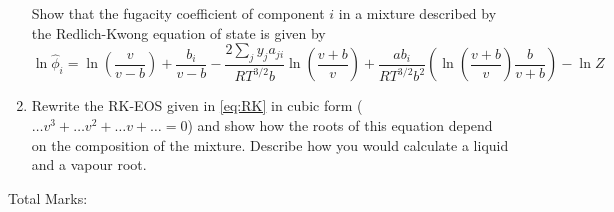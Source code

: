\documentclass[12pt, A4paper]{article}
\begin{document}
\begin{enumerate}
 Show that the fugacity coefficient of component $i$ in a mixture described by the Redlich-Kwong equation of state is given by
\begin{equation} \label{eq:phi_RK}
\ln{\hat{\phi}_i} = \ln{\left(\frac{v}{v - b} \right)}  + \frac{b_i}{v - b} - \frac{2 \sum_{j} y_j a_{ji}}{R T^{3/2} b} \ln{\left( \frac{v + b}{v} \right)}  + \frac{a b_i}{RT^{3/2} b^2} \left( \ln \left( \frac{v + b}{v}\right) \frac{b}{v + b}  \right) - \ln Z
\end{equation} 
\begin{flushright} 
\end{flushright}

\item Rewrite the RK-EOS given in \autoref{eq:RK} in cubic form ($\dots v^3 + \dots v^2 +\dots v  + \dots = 0 $) and show how the roots of this equation depend on the composition of the mixture. Describe how you would calculate a liquid and a vapour root.

\begin{flushright} 
\end{flushright}

\end{enumerate}

\begin{centering}
Total Marks: \\
\end{centering}
\end{document}
